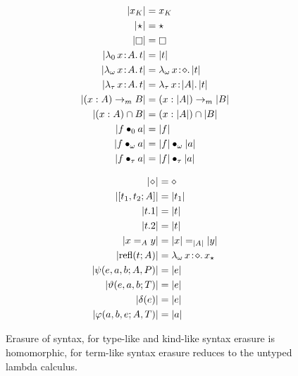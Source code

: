 

\begin{figure}
    \centering
    \begin{minipage}{0.5\textwidth}
        \begin{align*}
            |x_K| &= x_K \\
            |\!\star\!| &= \star \\
            |\kind| &= \kind \\
            |\abs{\lambda_0}{x}{A}{t}| &= |t| \\
            |\abs{\lambda_\omega}{x}{A}{t}| &= \abs{\lambda_\omega}{x}{\diamond}{|t|} \\
            |\abs{\lambda_\tau}{x}{A}{t}| &= \abs{\lambda_\tau}{x}{|A|}{|t|} \\
            |(x:A) \to_m B| &= (x:|A|) \to_m |B| \\
            |(x:A) \cap B| &= (x:|A|) \cap |B| \\
            |\app{f}{0}{a}| &= |f| \\
            |\app{f}{\omega}{a}| &= \app{|f|}{\omega}{|a|} \\
            |\app{f}{\tau}{a}| &= \app{|f|}{\tau}{|a|}
        \end{align*}
    \end{minipage}%
    \begin{minipage}{0.5\textwidth}
        \begin{align*}
            |\!\diamond\!| &= \diamond \\
            |[t_1, t_2; A]| &= |t_1| \\
            |t.1| &= |t| \\
            |t.2| &= |t| \\
            |x =_A y| &= |x| =_{|A|} |y| \\
            |\text{refl}(t; A)| &= {\lambda_\omega}\, x\! : \! \diamond.\, x_\star \\
            |\psi(e, a, b; A, P)| &= |e| \\
            |\vartheta(e, a, b; T)| &= |e| \\
            |\delta(e)| &= |e| \\
            |\varphi(a, b, e; A, T)| &= |a|
        \end{align*}
    \end{minipage}
    \caption{Erasure of syntax, for type-like and kind-like syntax erasure is homomorphic, for term-like syntax erasure reduces to the untyped lambda calculus.}
    \label{fig:2:erasure}
\end{figure}
